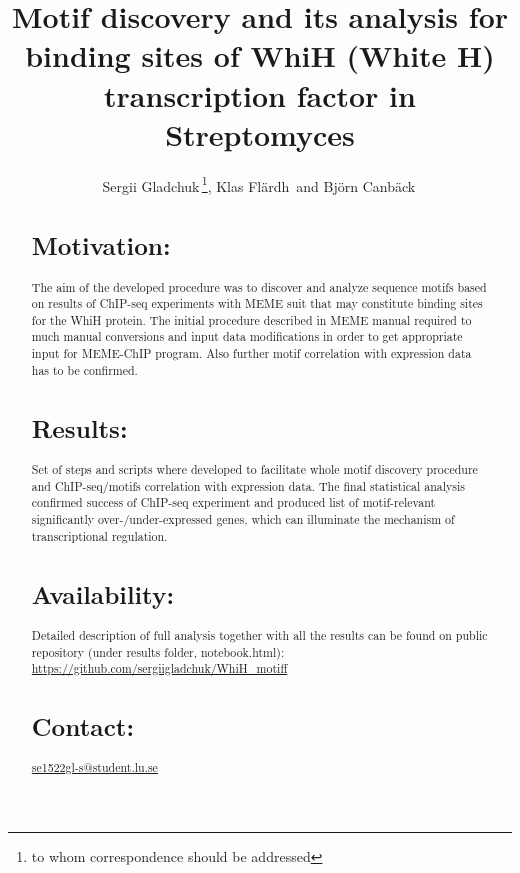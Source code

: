 \documentclass{bioinfo}
\begin{document}

\title[WhiH Motif discovery]{Motif discovery and its analysis for binding sites of WhiH (White H) transcription factor in Streptomyces}
\author[Gladchuk \textit{et~al}]{Sergii Gladchuk\,\footnote{to whom correspondence should be addressed}, Klas Fl{\"a}rdh\, and Bj{\"o}rn Canb{\"a}ck\,}

\address{Department of Biology, Box 118, 221 00, Lund University, Sweden}



\maketitle

\begin{abstract}

\section{Motivation:}
The aim of the developed procedure was to discover and analyze sequence motifs based on results of ChIP-seq experiments with MEME suit that may constitute binding sites for the WhiH protein. The initial procedure described in MEME manual required to much manual conversions and input data modifications in order to get appropriate input for MEME-ChIP program. Also further motif correlation with expression data has to be confirmed.

\section{Results:}
Set of steps and scripts where developed to facilitate whole motif discovery procedure and ChIP-seq/motifs correlation with expression data. The final statistical analysis confirmed success of ChIP-seq experiment and produced list of motif-relevant significantly over-/under-expressed genes, which can  illuminate the mechanism of transcriptional regulation.

\section{Availability:}
Detailed description of full analysis together with all the results can be found on public repository (under results folder, notebook.html): \href{https://github.com/sergiigladchuk/WhiH\_motiff}{https://github.com/sergiigladchuk/WhiH\_motiff}

\section{Contact:} \href{se1522gl-s@student.lu.se}{se1522gl-s@student.lu.se}
\end{abstract}
\end{document}
